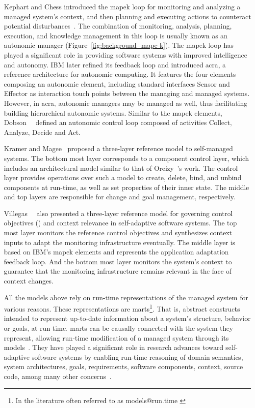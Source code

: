Kephart and Chess introduced the \gls{mapek} loop for monitoring and analyzing a managed system's context, and then planning and executing actions to counteract potential disturbances~\cite{kephart-2003-vision}. The combination of monitoring, analysis, planning, execution, and knowledge management in this loop is usually known as an autonomic manager (\cf Figure~\ref{fig:background--mape-k}). The \gls{mapek} loop has played a significant role in providing software systems with improved intelligence and autonomy. IBM later refined its feedback loop and introduced \gls{acra}, a reference architecture for autonomic computing. It features the four elements composing an autonomic element, including standard interfaces Sensor and Effector as interaction touch points between the managing and managed systems. However, in \gls{acra}, autonomic managers may be managed as well, thus facilitating building hierarchical autonomic systems. Similar to the \gls{mapek} elements, Dobson~\etal{}~\cite{dobson-2006-survey} defined an autonomic control loop composed of activities Collect, Analyze, Decide and Act.

Kramer and Magee~\cite{kramer-2007-self} proposed a three-layer reference model to self-managed systems. The bottom most layer corresponds to a component control layer, which includes an architectural model similar to that of Oreizy~\etal{}'s work. The control layer provides operations over such a model to create, delete, bind, and unbind components at run-time, as well as set properties of their inner state. The middle and top layers are responsible for change and goal management, respectively.

Villegas~\etal{}~\cite{villegas-2013-dynamico} also presented a three-layer reference model for governing control objectives () and context relevance in self-adaptive software systems. The top most layer monitors the reference control objectives and synthesizes context inputs to adapt the monitoring infrastructure eventually. The middle layer is based on IBM's \gls{mapek} elements and represents the application adaptation feedback loop. And the bottom most layer monitors the system's context to guarantee that the monitoring infrastructure remains relevant in the face of context changes.

All the models above rely on run-time representations of the managed system for various reasons. These representations are \glspl{mart}\footnote{In the literature often referred to as models@run.time \cite{blair-2009-models,bencomo-2019-models}}. That is, abstract constructs intended to represent up-to-date information about a system's structure, behavior or goals, at run-time. \glspl{mart} can be causally connected with the system they represent, allowing run-time modification of a managed system through its models~\cite{blair-2009-models}. They have played a significant role in research advances toward self-adaptive software systems by enabling run-time reasoning of domain semantics, system architectures, goals, requirements, software components, context, source code, among many other concerns~\cite{bencomo-2019-models}.

